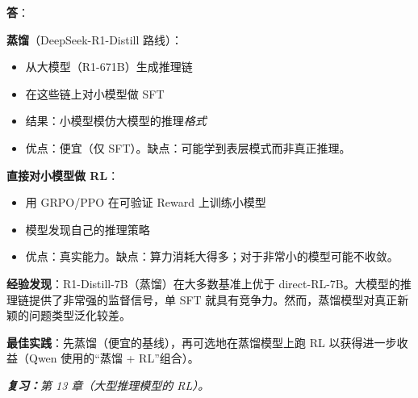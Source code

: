 \begin{questionbox}
\textbf{答}：

\textbf{蒸馏}（DeepSeek-R1-Distill 路线）：

\begin{itemize}
  \item 从大模型（R1-671B）生成推理链
  \item 在这些链上对小模型做 SFT
  \item 结果：小模型模仿大模型的推理\emph{格式}
  \item 优点：便宜（仅 SFT）。缺点：可能学到表层模式而非真正推理。
\end{itemize}

\textbf{直接对小模型做 RL}：

\begin{itemize}
  \item 用 GRPO/PPO 在可验证 Reward 上训练小模型
  \item 模型发现自己的推理策略
  \item 优点：真实能力。缺点：算力消耗大得多；对于非常小的模型可能不收敛。
\end{itemize}

\textbf{经验发现}：R1-Distill-7B（蒸馏）在大多数基准上优于 direct-RL-7B。大模型的推理链提供了非常强的监督信号，单 SFT 就具有竞争力。然而，蒸馏模型对真正新颖的问题类型泛化较差。

\textbf{最佳实践}：先蒸馏（便宜的基线），再可选地在蒸馏模型上跑 RL 以获得进一步收益（Qwen 使用的“蒸馏 + RL”组合）。

\emph{\textbf{复习：}第 13 章（大型推理模型的 RL）。}
\end{questionbox}

